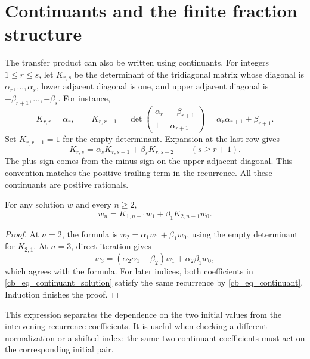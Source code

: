 \section{Continuants and the finite fraction structure}

The transfer product can also be written using continuants. For integers
$1\leq r\leq s$, let $K_{r,s}$ be the determinant of the tridiagonal matrix
whose diagonal is $\alpha_r,\ldots,\alpha_s$, lower adjacent diagonal is
one, and upper adjacent diagonal is
$-\beta_{r+1},\ldots,-\beta_s$. For instance,
\[
 K_{r,r}=\alpha_r,\qquad
 K_{r,r+1}=\det
 \begin{pmatrix}\alpha_r&-\beta_{r+1}\\1&\alpha_{r+1}\end{pmatrix}
 =\alpha_r\alpha_{r+1}+\beta_{r+1}.
\]
Set $K_{r,r-1}=1$ for the empty determinant. Expansion at the last row gives
\begin{equation}\label{cb_eq_continuant}
 K_{r,s}=\alpha_sK_{r,s-1}+\beta_sK_{r,s-2}
 \qquad(s\geq r+1).
\end{equation}
The plus sign comes from the minus sign on the upper adjacent diagonal.
This convention matches the positive trailing term in the recurrence.
All these continuants are positive rationals.

\begin{proposition}\label{cb_prop_continuant}
For any solution $w$ and every $n\geq2$,
\begin{equation}\label{cb_eq_continuant_solution}
 w_n=K_{1,n-1}w_1+\beta_1K_{2,n-1}w_0.
\end{equation}
\end{proposition}

\begin{proof}
At $n=2$, the formula is
$w_2=\alpha_1w_1+\beta_1w_0$, using the empty determinant for $K_{2,1}$.
At $n=3$, direct iteration gives
\[
 w_3=(\alpha_2\alpha_1+\beta_2)w_1+\alpha_2\beta_1w_0,
\]
which agrees with the formula. For later indices, both coefficients in
\eqref{cb_eq_continuant_solution} satisfy the same recurrence by
\eqref{cb_eq_continuant}. Induction finishes the proof.
\end{proof}

This expression separates the dependence on the two initial values from
the intervening recurrence coefficients. It is useful when checking a
different normalization or a shifted index: the same two continuant
coefficients must act on the corresponding initial pair.

